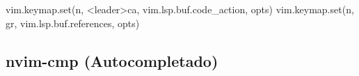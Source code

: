 \documentclass[
  doc,
  floatsintext,
  longtable,
  a4paper,
  nolmodern,
  notxfonts,
  notimes,
  12pt,
  colorlinks=true,linkcolor=blue,citecolor=blue,urlcolor=blue]{apa7}
\newenvironment{Shaded}{\begin{snugshade}}{\end{snugshade}}
\newcommand{\NormalTok}[1]{\textcolor[rgb]{0.00,0.23,0.31}{#1}}
\newcommand{\OperatorTok}[1]{\textcolor[rgb]{0.37,0.37,0.37}{#1}}
\newcommand{\StringTok}[1]{\textcolor[rgb]{0.13,0.47,0.30}{#1}}
\newcommand{\VariableTok}[1]{\textcolor[rgb]{0.07,0.07,0.07}{#1}}
\begin{document}
\begin{Shaded}
\begin{Highlighting}[]
\VariableTok{vim}\OperatorTok{.}\VariableTok{keymap}\OperatorTok{.}\NormalTok{set}\OperatorTok{(}\StringTok{\textquotesingle{}n\textquotesingle{}}\OperatorTok{,} \StringTok{\textquotesingle{}\textless{}leader\textgreater{}ca\textquotesingle{}}\OperatorTok{,} \VariableTok{vim}\OperatorTok{.}\VariableTok{lsp}\OperatorTok{.}\VariableTok{buf}\OperatorTok{.}\VariableTok{code\_action}\OperatorTok{,} \VariableTok{opts}\OperatorTok{)}
\VariableTok{vim}\OperatorTok{.}\VariableTok{keymap}\OperatorTok{.}\NormalTok{set}\OperatorTok{(}\StringTok{\textquotesingle{}n\textquotesingle{}}\OperatorTok{,} \StringTok{\textquotesingle{}gr\textquotesingle{}}\OperatorTok{,} \VariableTok{vim}\OperatorTok{.}\VariableTok{lsp}\OperatorTok{.}\VariableTok{buf}\OperatorTok{.}\VariableTok{references}\OperatorTok{,} \VariableTok{opts}\OperatorTok{)}
\end{Highlighting}
\end{Shaded}

\subsection{nvim-cmp (Autocompletado)}\label{nvim-cmp-autocompletado}
\end{document}
